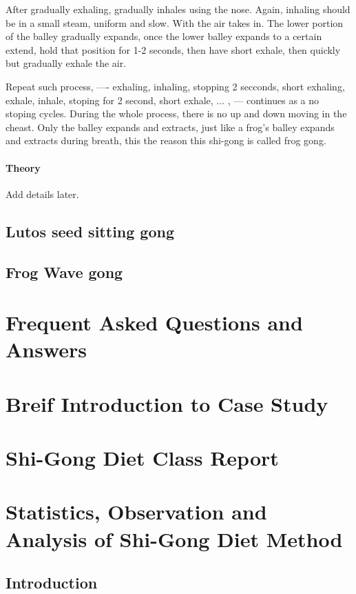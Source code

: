 After gradually exhaling, gradually inhales using the nose. Again, inhaling should be in a
small steam, uniform and slow. With the air takes in. The lower portion of the balley gradually expands, once
the lower balley expands to a certain extend, hold that position for 1-2 seconds, then have short exhale, then
quickly but gradually exhale the air. 
\vspace{0.05 in}

Repeat such process, ---- exhaling, inhaling, stopping 2 secconds, short exhaling, exhale, inhale, stoping for
2 second, short exhale, ... , --- continues as a no stoping cycles.  During the whole process, there is no
up and down moving in the cheast. Only the balley expands and extracts, just like a frog's balley expands and
extracts during breath, this the reason this shi-gong is called frog gong.

\vspace{0.05 in} 

\subsubsection{Theory}

 Add details later.

\section{Lutos seed sitting gong}
\section{Frog Wave gong}

\chapter{Frequent Asked Questions and Answers}
\chapter{Breif Introduction to Case Study}
\chapter{Shi-Gong Diet Class Report}
\chapter{Statistics, Observation and Analysis of Shi-Gong Diet Method}
\section{Introduction}
